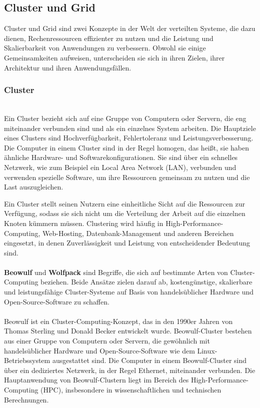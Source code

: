 \documentclass[../vs-script-first-v01.tex]{subfiles}
\begin{document}
\subsection{Cluster und Grid}

Cluster und Grid sind zwei Konzepte in der Welt der verteilten Systeme, die dazu dienen, Rechenressourcen effizienter zu nutzen und die Leistung und Skalierbarkeit von Anwendungen zu verbessern. Obwohl sie einige Gemeinsamkeiten aufweisen, unterscheiden sie sich in ihren Zielen, ihrer Architektur und ihren Anwendungsfällen.
\subsubsection{Cluster}\mbox{}\\
Ein Cluster bezieht sich auf eine Gruppe von Computern oder Servern, die eng miteinander verbunden sind und als ein einzelnes System arbeiten. Die Hauptziele eines Clusters sind Hochverfügbarkeit, Fehlertoleranz und Leistungsverbesserung. Die Computer in einem Cluster sind in der Regel homogen, das heißt, sie haben ähnliche Hardware- und Softwarekonfigurationen. Sie sind über ein schnelles Netzwerk, wie zum Beispiel ein Local Area Network (LAN), verbunden und verwenden spezielle Software, um ihre Ressourcen gemeinsam zu nutzen und die Last auszugleichen.

Ein Cluster stellt seinen Nutzern eine einheitliche Sicht auf die Ressourcen zur Verfügung, sodass sie sich nicht um die Verteilung der Arbeit auf die einzelnen Knoten kümmern müssen. Clustering wird häufig in High-Performance-Computing, Web-Hosting, Datenbank-Management und anderen Bereichen eingesetzt, in denen Zuverlässigkeit und Leistung von entscheidender Bedeutung sind.
\\\\
\textbf{Beowulf} und \textbf{Wolfpack} sind Begriffe, die sich auf bestimmte Arten von Cluster-Computing beziehen. Beide Ansätze zielen darauf ab, kostengünstige, skalierbare und leistungsfähige Cluster-Systeme auf Basis von handelsüblicher Hardware und Open-Source-Software zu schaffen.
\\\\
Beowulf ist ein Cluster-Computing-Konzept, das in den 1990er Jahren von Thomas Sterling und Donald Becker entwickelt wurde. Beowulf-Cluster bestehen aus einer Gruppe von Computern oder Servern, die gewöhnlich mit handelsüblicher Hardware und Open-Source-Software wie dem Linux-Betriebssystem ausgestattet sind. Die Computer in einem Beowulf-Cluster sind über ein dediziertes Netzwerk, in der Regel Ethernet, miteinander verbunden. Die Hauptanwendung von Beowulf-Clustern liegt im Bereich des High-Performance-Computing (HPC), insbesondere in wissenschaftlichen und technischen Berechnungen.
\end{document}
